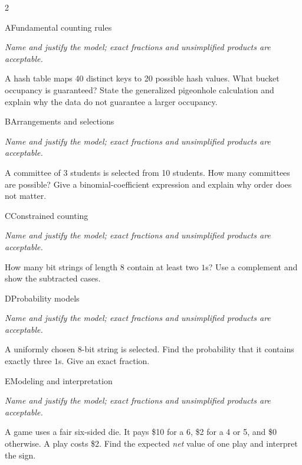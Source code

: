 \documentclass[9pt]{extarticle}
\begin{document}
\begin{multicols}{2}
\begin{CoreProblem}{A}{Fundamental counting rules}
{\scriptsize\textit{Name and justify the model; exact fractions and unsimplified products are acceptable.}\par}
A hash table maps 40 distinct keys to 20 possible hash values. What
    bucket occupancy is guaranteed? State the generalized pigeonhole calculation
    and explain why the data do not guarantee a larger occupancy.
\end{CoreProblem}
\begin{CoreProblem}{B}{Arrangements and selections}
{\scriptsize\textit{Name and justify the model; exact fractions and unsimplified products are acceptable.}\par}
A committee of 3 students is selected from 10 students. How many
    committees are possible? Give a binomial-coefficient expression and explain
    why order does not matter.
\end{CoreProblem}
\begin{CoreProblem}{C}{Constrained counting}
{\scriptsize\textit{Name and justify the model; exact fractions and unsimplified products are acceptable.}\par}
How many bit strings of length 8 contain at least two $1$s? Use a
    complement and show the subtracted cases.
\end{CoreProblem}
\columnbreak
\begin{CoreProblem}{D}{Probability models}
{\scriptsize\textit{Name and justify the model; exact fractions and unsimplified products are acceptable.}\par}
A uniformly chosen 8-bit string is selected. Find the probability
    that it contains exactly three $1$s. Give an exact fraction.
\end{CoreProblem}
\begin{CoreProblem}{E}{Modeling and interpretation}
{\scriptsize\textit{Name and justify the model; exact fractions and unsimplified products are acceptable.}\par}
A game uses a fair six-sided die. It pays \$10 for a 6, \$2 for a 4
    or 5, and \$0 otherwise. A play costs \$2. Find the expected \emph{net}
    value of one play and interpret the sign.
\end{CoreProblem}
\end{multicols}
\CoreWorkArea
\FormBreak
{}
\end{document}
